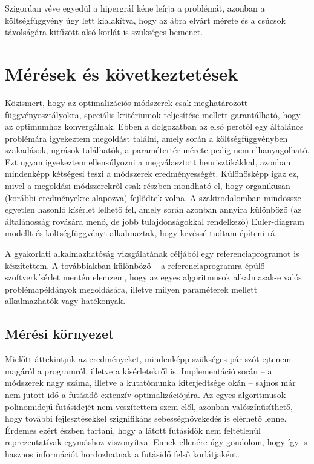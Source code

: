 Szigorúan véve egyedül a hipergráf kéne leírja a problémát, azonban a költségfüggvény úgy lett kialakítva, hogy az ábra elvárt mérete és a csúcsok távolságára kitűzött alsó korlát is szükséges bemenet.



\section{Mérések és következtetések}

Közismert, hogy az optimalizációs módszerek csak meghatározott függvényosztályokra, speciális kritériumok teljesítése mellett garantálható, hogy az optimumhoz konvergálnak. Ebben a dolgozatban az első perctől egy általános problémára igyekeztem megoldást találni, amely során a költségfüggvényben szakadások, ugrások találhatók, a paramétertér mérete pedig nem elhanyagolható. Ezt ugyan igyekeztem ellensúlyozni a megválasztott heurisztikákkal, azonban mindenképp kétségesi teszi a módszerek eredményességét. Különösképp igaz ez, mivel a megoldási módszerekről csak részben mondható el, hogy organikusan (korábbi eredményekre alapozva) fejlődtek volna. A szakirodalomban mindössze egyetlen hasonló kísérlet lelhető fel\cite{layout_metrics}, amely során azonban annyira különböző (az általánosság rovására menő, de jobb tulajdonságokkal rendelkező) Euler-diagram modellt és költségfüggvényt alkalmaztak, hogy kevéssé tudtam építeni rá.


A gyakorlati alkalmazhatóság vizsgálatának céljából egy referenciaprogramot is készítettem. A továbbiakban különböző -- a referenciaprogramra épülő -- szoftverkísérlet mentén elemzem, hogy az egyes algoritmusok alkalmasak-e valós problémapéldányok megoldására, illetve milyen paraméterek mellett alkalmazhatók vagy hatékonyak.


\subsection{Mérési környezet}

Mielőtt áttekintjük az eredményeket, mindenképp szükséges pár szót ejtenem magáról a programról, illetve a kísérletekről is. Implementáció során -- a módszerek nagy száma, illetve a kutatómunka kiterjedtsége okán -- sajnos már nem jutott idő a futásidő extenzív optimalizációjára. Az egyes algoritmusok polinomidejű futásidejét nem veszítettem szem elől, azonban valószínűsíthető, hogy további fejlesztésekkel szignifikáns sebességnövekedés is elérhető lenne. Érdemes ezért észben tartani, hogy a látott futásidők nem feltétlenül reprezentatívak egymáshoz viszonyítva. Ennek ellenére úgy gondolom, hogy így is hasznos információt hordozhatnak a futásidő felső korlátjaként.



